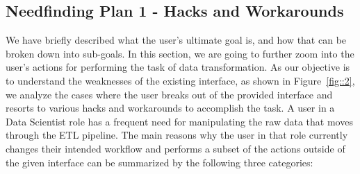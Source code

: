 \documentclass[12pt,letterpaper]{article}
\begin{document}

\subsection*{Needfinding Plan 1 - Hacks and Workarounds}
We have briefly described what the user's ultimate goal is, and how that can be broken down into sub-goals. In this section, we are going to further zoom into the user's actions for performing the task of data transformation. As our objective is to understand the weaknesses of the existing interface, as shown in Figure~\ref{fig::2}, we analyze the cases where the user breaks out of the provided interface and resorts to various hacks and workarounds to accomplish the task. A user in a Data Scientist role has a frequent need for manipulating the raw data that moves through the ETL pipeline. The main reasons why the user in that role currently changes their intended workflow and performs a subset of the actions outside of the given interface can be summarized by the following three categories: 
\end{document}

